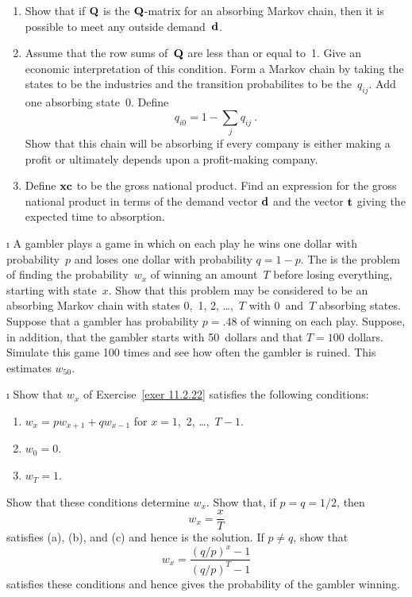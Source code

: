 \begin{LJSItem}
\begin{enumerate}
\item Show that if ${\mbox{\bf Q}\/}$ is the ${\mbox{\bf Q}\/}$-matrix for an absorbing
Markov chain, then it is possible to meet any outside demand~${\mbox{\bf d}\/}$.

\item Assume that the row sums of~${\mbox{\bf Q}\/}$ are less than or equal to~1. 
Give an economic interpretation of this condition.  Form a Markov chain by
taking the states to be the industries and the transition probabilites to be
the~$q_{ij}$.  Add one absorbing state~0.  Define
$$
q_{i0} = 1 - \sum_j q_{ij}\ .
$$
Show that this chain will be absorbing if every company is either making a
profit or ultimately depends upon a profit-making company.

\item Define ${\mbox{\bf x}\/} {\mbox{\bf c}\/}$ to be the gross national product.  Find an
expression for the gross national product in terms of the demand vector
${\mbox{\bf d}\/}$
and the vector ${\mbox{\bf t}\/}$ giving the expected time to absorption.
\end{enumerate}

\i\label{exer 11.2.22} A gambler plays a game in which on each play he wins
one dollar with probability~$p$ and loses one dollar with probability $q = 1 -
p$.  The  is the
problem of
finding the probability~$w_x$ of winning an amount~$T$ before losing
everything, starting
with state~$x$.  Show that this problem may be considered to be an absorbing
Markov chain with states 0,~1, 2, \ldots,~$T$ with 0~and~$T$ absorbing states. 
Suppose that a gambler has probability $p = .48$ of winning on each play.  
Suppose, in addition, that the gambler starts with 50~dollars and that $T =
100$
dollars.  Simulate this game 100 times and see how often the gambler is ruined.  
This estimates $w_{50}$.

\i\label{exer 11.2.23} Show that $w_x$ of Exercise~\ref{exer 11.2.22} satisfies
the
following conditions:
\begin{enumerate}

\item $w_x = pw_{x + 1} + qw_{x - 1}$ for $x = 1$,~2, \ldots,\ $T - 1$.

\item $w_0 = 0$.

\item $w_T = 1$.
\end{enumerate}

\noindent Show that these conditions determine $w_x$.  Show that, if $p = q =
1/2$, then
$$
w_x = \frac xT
$$
satisfies (a), (b), and (c) and hence is the solution.  If $p \ne q$, show that
$$
w_x = \frac{(q/p)^x - 1}{(q/p)^T - 1}
$$
satisfies these conditions and hence gives the probability of the gambler
winning.


\end{LJSItem}
